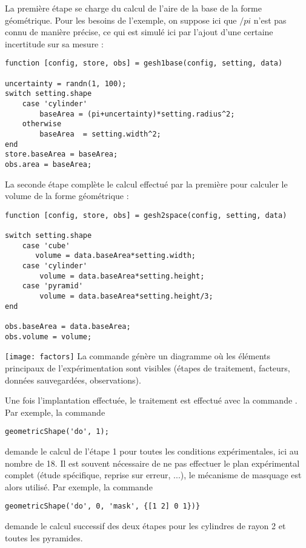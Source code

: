 La première étape se charge du calcul de l'aire de la base de la forme géométrique. Pour les besoins de l'exemple, on suppose ici que $/pi$ n'est pas connu de manière précise, ce qui est simulé ici par l'ajout d'une certaine incertitude sur sa mesure :
\begin{lstlisting}
function [config, store, obs] = gesh1base(config, setting, data)

uncertainty = randn(1, 100);
switch setting.shape
    case 'cylinder'
        baseArea = (pi+uncertainty)*setting.radius^2;
    otherwise
        baseArea  = setting.width^2;
end
store.baseArea = baseArea;
obs.area = baseArea;
\end{lstlisting}

La seconde étape complète le calcul effectué par la première pour calculer le volume de la forme géométrique :
\begin{lstlisting}
function [config, store, obs] = gesh2space(config, setting, data)

switch setting.shape
    case 'cube'
       volume = data.baseArea*setting.width;
    case 'cylinder'
        volume = data.baseArea*setting.height;
    case 'pyramid'
        volume = data.baseArea*setting.height/3;
end

obs.baseArea = data.baseArea;
obs.volume = volume;
\end{lstlisting}

\begin{marginfigure}
\texttt{[image: factors]}
La commande  génère un diagramme où les éléments principaux de l'expérimentation sont visibles (étapes de traitement, facteurs, données sauvegardées, observations).
\end{marginfigure}

Une fois l'implantation effectuée, le traitement est effectué avec la commande . Par exemple, la commande
\begin{lstlisting}
geometricShape('do', 1);
\end{lstlisting}
demande le calcul de l'étape 1 pour toutes les conditions expérimentales, ici au nombre de 18. Il est souvent nécessaire de ne pas effectuer le plan expérimental complet (étude spécifique, reprise sur erreur, ...), le mécanisme de masquage est alors utilisé. Par exemple, la commande
\begin{lstlisting}
geometricShape('do', 0, 'mask', {[1 2] 0 1})}
\end{lstlisting}
demande le calcul successif des deux étapes pour les cylindres de rayon 2 et toutes les pyramides.

